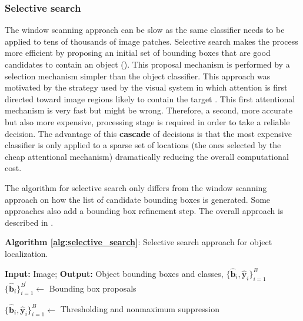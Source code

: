 \subsubsection{Selective search}
The window scanning approach can be slow as the same classifier needs to be applied to tens of thousands of image patches. Selective search makes the process more efficient by proposing an initial set of bounding boxes that are good candidates to contain an object (\fig{\ref{fig:selective_search_pipeline}}). This proposal mechanism is performed by a selection mechanism simpler than the object classifier. 
This approach was motivated by the strategy used by the visual system in which attention is first directed toward image regions likely to contain the target \cite{wolfe2007,TreismanGelade1980,Koch_Ullman_1985}. This first attentional mechanism is very fast but might be wrong. Therefore, a second, more accurate but also more expensive, processing stage is required in order to take a reliable decision.  The advantage of this {\bf cascade}
of decisions is that the most expensive classifier is only applied to a sparse set of locations (the ones selected by the cheap attentional mechanism) dramatically reducing the overall computational cost. 




The algorithm for selective search only differs from the window scanning approach on how the list of candidate bounding boxes is generated. Some approaches also add a bounding box refinement step.
The overall approach is described in \algref{\ref{alg:selective_search}}.

\begin{algorithm}[h]
\SetAlgoVlined
\DontPrintSemicolon
\caption{{\bf Algorithm \ref{alg:selective_search}}: Selective search approach for object localization.}
\fakealgorithmcaption{}
\label{alg:selective_search}
{\bf Input:} Image;
{\bf Output:} Object bounding boxes and classes, $\{\hat{\mathbf{b}}_i, \hat{\mathbf{y}}_i\}_{i=1}^B$\;
$\{\hat{\mathbf{b}}_i\}_{i=1}^{B^{\prime}} \leftarrow$ Bounding box proposals\;

$\{\hat{\mathbf{b}}_i, \hat{\mathbf{y}}_i\}_{i=1}^B \leftarrow$ Thresholding and nonmaximum suppression\;
\end{algorithm}



